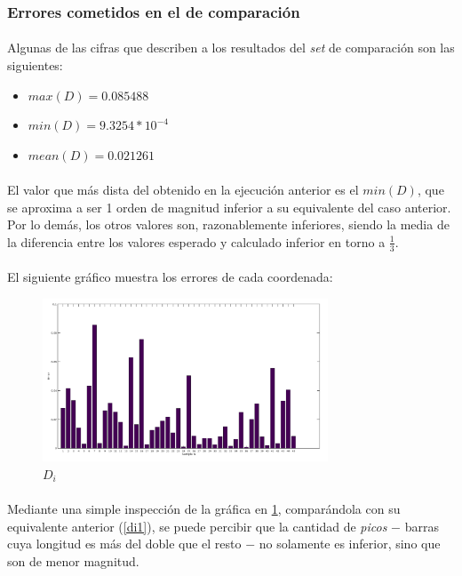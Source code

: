\documentclass[12pt, twocolumn]{article}
\begin{document}
	\subsubsection{Errores cometidos en el  de comparación}
	
	\paragraph{} Algunas de las cifras que describen a los resultados del \textit{set} de comparación son las siguientes:
	
	\begin{itemize}
		\item $max(D) = 0.085488$
		\item $min(D) = 9.3254*10^{-4}$
		\item $mean(D) = 0.021261$
	\end{itemize}
	
	\paragraph{} El valor que más dista del obtenido en la ejecución anterior es el $min(D)$, que se aproxima a ser 1 orden de magnitud inferior a su equivalente del caso anterior. Por lo demás, los otros valores son, razonablemente inferiores, siendo la media de la diferencia entre los valores esperado y calculado inferior en torno a $\frac{1}{3}$. 
	
	\paragraph{} El siguiente gráfico muestra los errores de cada coordenada:
	
	\begin{figure}[H]
		\centering
		\includegraphics[width=8.5cm]{../results/batch_momentum/2/bar_batch.png}
		\caption{$D_i$}
		\label{di2}
	\end{figure}
	
	\paragraph{} Mediante una simple inspección de la gráfica en \ref{di2}, comparándola con su equivalente anterior (\ref{di1}), se puede percibir que la cantidad de \textit{picos} $-$ barras cuya longitud es más del doble que el resto $-$ no solamente es inferior, sino que son de menor magnitud. 
	
\end{document}
